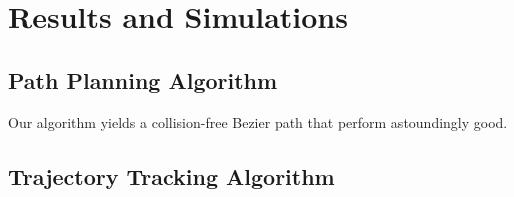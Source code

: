 \documentclass[11pt, a4paper]{article}
\begin{document}







\section{Results and Simulations}
  \subsection{Path Planning Algorithm}
  Our algorithm yields a collision-free Bezier path that perform astoundingly good.
  \subsection{Trajectory Tracking Algorithm}


\end{document}
